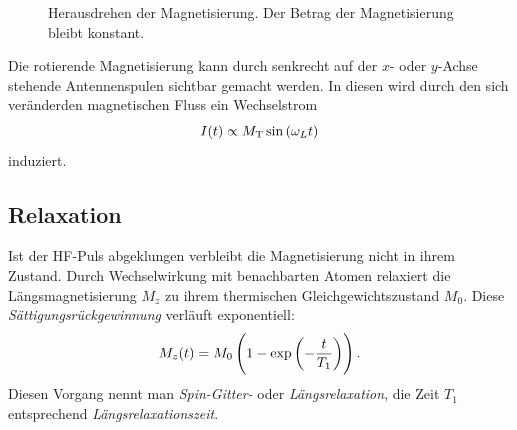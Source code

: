\documentclass[
    11pt,
    ngerman
]{scrreprt}
\begin{document}
\begin{figure}[htbp]
\begin{minipage}[htbp]{.45\textwidth}
        \caption{%
            Umklappen der Magnetisierung im mit $\omega_\text{L}$ um die $z$-Achse rotierenden Koordinatensystem.
        }
        \label{fig:kernspinresonanz_rot}
    \end{minipage}
    \hfill
    \begin{minipage}[htbp]{.45\textwidth}
        \centering
        \caption{%
            Herausdrehen der Magnetisierung. Der Betrag der Magnetisierung bleibt konstant.
        }
        \label{fig:kernspinresonanz_drauf}
    \end{minipage}
\end{figure}

Die rotierende Magnetisierung kann durch senkrecht auf der $x$- oder $y$-Achse stehende Antennenspulen sichtbar gemacht werden. In diesen wird durch den sich veränderden magnetischen Fluss ein Wechselstrom
\[
    I(t) \propto M_\text{T} \sin\left({\omega_L t}\right)
\]
induziert.



    

\subsection{Relaxation}

Ist der HF-Puls abgeklungen verbleibt die Magnetisierung nicht in ihrem
Zustand. Durch Wechselwirkung mit benachbarten Atomen relaxiert die Längsmagnetisierung $M_z$ zu ihrem
thermischen Gleichgewichtszustand $M_0$. Diese \emph{Sättigungsrückgewinnung} verläuft exponentiell:
\[
    M_z(t) = M_0\del{1-\dexp{-\frac{t}{T_1}}}.
\]
Diesen Vorgang nennt man \emph{Spin-Gitter-} oder \emph{Längsrelaxation}, die
Zeit $T_1$ entsprechend \emph{Längsrelaxationszeit}.
\end{document}
